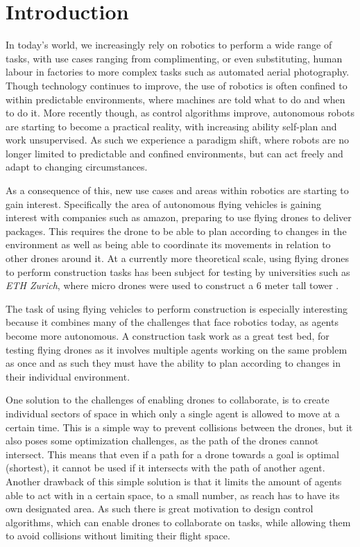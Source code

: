 \chapter{Introduction}

In today's world, we increasingly rely on robotics to perform a wide range of tasks, with use cases ranging from complimenting, or even substituting, human labour in factories to more complex tasks such as automated aerial photography. 
Though technology continues to improve, the use of robotics is often confined to within predictable environments, where machines are told what to do and when to do it. 
More recently though, as control algorithms improve, autonomous robots are starting to become a practical reality, with increasing ability self-plan and work unsupervised. 
As such we experience a paradigm shift, where robots are no longer limited to predictable and confined environments, but can act freely and adapt to changing circumstances. 

As a consequence of this, new use cases and areas within robotics are starting to gain interest. 
Specifically the area of autonomous flying vehicles is gaining interest with companies such as amazon, preparing to use flying drones to deliver packages.
This requires the drone to be able to plan according to changes in the environment as well as being able to coordinate its movements in relation to other drones around it. 
At a currently more theoretical scale, using flying drones to perform construction tasks has been subject for testing by universities such as \textit{ETH Zurich}, where micro drones were used to construct a 6 meter tall tower \cite{augugliaro_flight_2014}. 

The task of using flying vehicles to perform construction is especially interesting because it combines many of the challenges that face robotics today, as agents become more autonomous. 
A construction task work as a great test bed, for testing flying drones as it involves multiple agents working on the same problem as once and as such they must have the ability to plan according to changes in their individual environment. 

One solution to the challenges of enabling drones to collaborate, is to create individual sectors of space in which only a single agent is allowed to move at a certain time. 
This is a simple way to prevent collisions between the drones, but it also poses some optimization challenges, as the path of the drones cannot intersect. 
This means that even if a path for a drone towards a goal is optimal (shortest), it cannot be used if it intersects with the path of another agent. 
Another drawback of this simple solution is that it limits the amount of agents able to act with in a certain space, to a small number, as reach has to have its own designated area. As such there is great motivation to design control algorithms, which can enable drones to collaborate on tasks, while allowing them to avoid collisions without limiting their flight space. 

